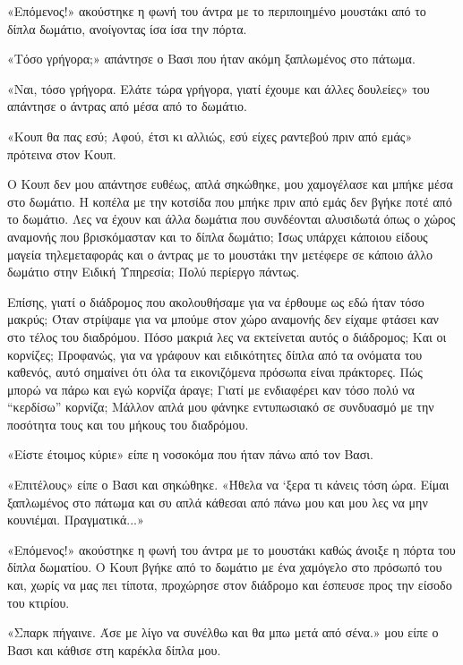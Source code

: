 \documentclass[12pt,twoside, openany]{book}
\begin{document}
«Επόμενος!» ακούστηκε η φωνή του άντρα με το περιποιημένο μουστάκι από το δίπλα δωμάτιο, ανοίγοντας ίσα ίσα την πόρτα.

«Τόσο γρήγορα;» απάντησε ο Βασι που ήταν ακόμη ξαπλωμένος στο πάτωμα.

«Ναι, τόσο γρήγορα. Ελάτε τώρα γρήγορα, γιατί έχουμε και άλλες δουλείες» του απάντησε ο άντρας από μέσα από το δωμάτιο.

«Κουπ θα πας εσύ; Αφού, έτσι κι αλλιώς, εσύ είχες ραντεβού πριν από εμάς» πρότεινα στον Κουπ.

Ο Κουπ δεν μου απάντησε ευθέως, απλά σηκώθηκε, μου χαμογέλασε και μπήκε μέσα στο δωμάτιο. Η κοπέλα με την κοτσίδα που μπήκε πριν από εμάς δεν βγήκε ποτέ από το δωμάτιο. Λες να έχουν και άλλα δωμάτια που συνδέονται αλυσιδωτά όπως ο χώρος αναμονής που βρισκόμασταν και το δίπλα δωμάτιο; Ίσως υπάρχει κάποιου είδους μαγεία τηλεμεταφοράς και ο άντρας με το μουστάκι την μετέφερε σε κάποιο άλλο δωμάτιο στην Ειδική Υπηρεσία; Πολύ περίεργο πάντως.

Επίσης, γιατί ο διάδρομος που ακολουθήσαμε για να έρθουμε ως εδώ ήταν τόσο μακρύς; Όταν στρίψαμε για να μπούμε στον χώρο αναμονής δεν είχαμε φτάσει καν στο τέλος του διαδρόμου. Πόσο μακριά λες να εκτείνεται αυτός ο διάδρομος; Και οι κορνίζες; Προφανώς, για να γράφουν και ειδικότητες δίπλα από τα ονόματα του καθενός, αυτό σημαίνει ότι όλα τα εικονιζόμενα πρόσωπα είναι πράκτορες. Πώς μπορώ να πάρω και εγώ κορνίζα άραγε; Γιατί με ενδιαφέρει καν τόσο πολύ να “κερδίσω” κορνίζα; Μάλλον απλά μου φάνηκε εντυπωσιακό σε συνδυασμό με την ποσότητα τους και του μήκους του διαδρόμου.

«Είστε έτοιμος κύριε» είπε η νοσοκόμα που ήταν πάνω από τον Βασι.

«Επιτέλους» είπε ο Βασι και σηκώθηκε. «Ήθελα να ‘ξερα τι κάνεις τόση ώρα. Είμαι ξαπλωμένος στο πάτωμα και συ απλά κάθεσαι από πάνω μου και μου λες να μην κουνιέμαι. Πραγματικά...»

«Επόμενος!» ακούστηκε η φωνή του άντρα με το μουστάκι καθώς άνοιξε η πόρτα του δίπλα δωματίου. Ο Κουπ βγήκε από το δωμάτιο με ένα χαμόγελο στο πρόσωπό του και, χωρίς να μας πει τίποτα, προχώρησε στον διάδρομο και έσπευσε προς την είσοδο του κτιρίου.

«Σπαρκ πήγαινε. Άσε με λίγο να συνέλθω και θα μπω μετά από σένα.» μου είπε ο Βασι και κάθισε στη καρέκλα δίπλα μου.
\end{document}
